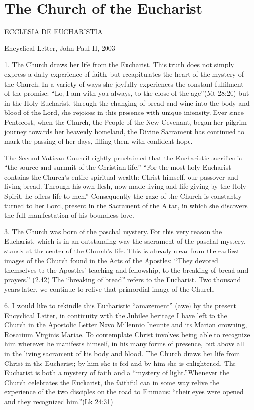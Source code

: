 \documentclass[oneside]{book}
\begin{document}

\chapter{The Church of the Eucharist}

ECCLESIA DE EUCHARISTIA

Encyclical Letter, John Paul II, 2003


1. The Church draws her life from the Eucharist. This truth does not simply
express a daily experience of faith, but recapitulates the heart of the mystery
of the Church. In a variety of ways she joyfully experiences the constant
fulfilment of the promise: ``Lo, I am with you always, to the close of the
age''(Mt 28:20) but in the Holy Eucharist, through the changing of bread and
wine into the body and blood of the Lord, she rejoices in this presence with
unique intensity. Ever since Pentecost, when the Church, the People of the New
Covenant, began her pilgrim journey towards her heavenly homeland, the Divine
Sacrament has continued to mark the passing of her days, filling them with
confident hope.

The Second Vatican Council rightly proclaimed that the Eucharistic sacrifice is
``the source and summit of the Christian life.'' ``For the most holy Eucharist
contains the Church's entire spiritual wealth: Christ himself, our passover and
living bread. Through his own flesh, now made living and life-giving by the Holy
Spirit, he offers life to men.'' Consequently the gaze of the Church is
constantly turned to her Lord, present in the Sacrament of the Altar, in which
she discovers the full manifestation of his boundless love.

3. The Church was born of the paschal mystery. For this very reason the
Eucharist, which is in an outstanding way the sacrament of the paschal mystery,
stands at the center of the Church's life. This is already clear from the
earliest images of the Church found in the Acts of the Apostles: ``They devoted
themselves to the Apostles' teaching and fellowship, to the breaking of bread
and prayers.'' (2.42) The ``breaking of bread'' refers to the Eucharist. Two
thousand years later, we continue to relive that primordial image of the Church.

6. I would like to rekindle this Eucharistic ``amazement'' (awe) by the present
Encyclical Letter,  in continuity with the Jubilee heritage I have left to the
Church in the Apostolic Letter Novo Millennio Ineunte and its Marian crowning,
Rosarium Virginis Mariae. To contemplate Christ involves being able to recognize
him wherever he manifests himself, in his many forms of presence, but above all
in the living sacrament of his body and blood. The Church draws her life from
Christ in the Eucharist; by him she is fed and by him she is enlightened. The
Eucharist is both a mystery of faith and a ``mystery of light.''Whenever the
Church celebrates the Eucharist, the faithful can in some way relive the
experience of the two disciples on the road to Emmaus: ``their eyes were opened
and they recognized him.''(Lk 24:31)
\end{document}
